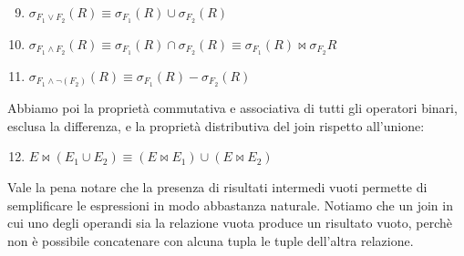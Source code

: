 \documentclass[12pt]{report}
\begin{document}
 	\begin{enumerate}
 		\setcounter{enumi}{8}
 		\item $\sigma_{F_1 \vee F_2}(R) \equiv \sigma_{F_1}(R) \cup \sigma_{F_2}(R)$
 		\item $\sigma_{F_1 \wedge F_2}(R) \equiv \sigma_{F_1}(R) \cap \sigma_{F_2}(R) \equiv \sigma_{F_1}(R) \bowtie \sigma_{F_2}{R}$
 		\item $\sigma_{F_1 \wedge \neg(F_2)}(R) \equiv \sigma_{F_1}(R) - \sigma_{F_2}(R)$
 	\end{enumerate}
 	Abbiamo poi la proprietà commutativa e associativa di tutti gli operatori binari, esclusa la differenza, e la proprietà distributiva del join rispetto all'unione:
 	\begin{enumerate}
 		\setcounter{enumi}{11}
 		\item $E \bowtie (E_1 \cup E_2) \equiv (E \bowtie E_1) \cup (E \bowtie E_2)$
 	\end{enumerate}
 	Vale la pena notare che la presenza di risultati intermedi vuoti permette di semplificare le espressioni in modo abbastanza naturale. Notiamo che un join in cui uno degli operandi sia la relazione vuota produce un risultato vuoto, perchè non è possibile concatenare con alcuna tupla le tuple dell'altra relazione.
\end{document}
